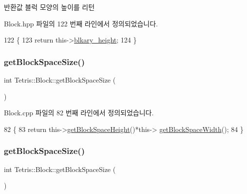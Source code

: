 \begin{DoxyReturn}{반환값}
블럭 모양의 높이를 리턴 
\end{DoxyReturn}


Block.\+hpp 파일의 122 번째 라인에서 정의되었습니다.


\begin{DoxyCode}
122                                      \{
123                 \textcolor{keywordflow}{return} this->\hyperlink{class_tetris_1_1_block_abbea7737c2b1fb7339aab4dff13de27c}{blkary\_height};
124             \}
\end{DoxyCode}
\mbox{\label{class_tetris_1_1_block_a356cba210ff93bbd80c10d4d00c81cc2}} 
\subsubsection{\texorpdfstring{get\+Block\+Space\+Size()}{getBlockSpaceSize()}\hspace{0.1cm}{\footnotesize\ttfamily [1/2]}}
{\footnotesize\ttfamily int Tetris\+::\+Block\+::get\+Block\+Space\+Size (\begin{DoxyParamCaption}{ }\end{DoxyParamCaption})}



Block.\+cpp 파일의 82 번째 라인에서 정의되었습니다.


\begin{DoxyCode}
82                             \{
83                 \textcolor{keywordflow}{return} this->\hyperlink{class_tetris_1_1_block_a5301977e32c03aaf122fa289fcba77ba}{getBlockSpaceHeight}()*this->
      \hyperlink{class_tetris_1_1_block_ac390e14de476582300d815d9054ed9bd}{getBlockSpaceWidth}();
84             \}
\end{DoxyCode}
\mbox{\label{class_tetris_1_1_block_a356cba210ff93bbd80c10d4d00c81cc2}} 
\subsubsection{\texorpdfstring{get\+Block\+Space\+Size()}{getBlockSpaceSize()}\hspace{0.1cm}{\footnotesize\ttfamily [2/2]}}
{\footnotesize\ttfamily int Tetris\+::\+Block\+::get\+Block\+Space\+Size (\begin{DoxyParamCaption}{ }\end{DoxyParamCaption})\hspace{0.3cm}{\ttfamily [inline]}}

